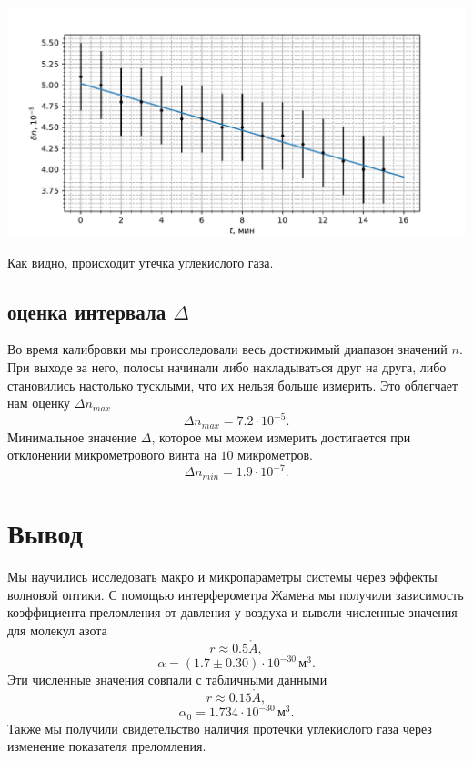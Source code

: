 \documentclass[a4paper,12pt]{article}
\renewcommand{\AA}{\ensuremath{\mathring{A}}}
\begin{document}
\begin{center}
\includegraphics[width=\textwidth]{time.pdf}
\end{center}

Как видно, происходит утечка углекислого газа.

\subsection{оценка интервала $\Delta$}
Во время калибровки мы происследовали весь достижимый диапазон значений $n$. При выходе за него, полосы начинали либо накладываться друг на друга, либо становились настолько тусклыми, что их нельзя больше измерить. Это облегчает нам оценку $\Delta n_{max}$
\[\Delta n_{max} = 7.2 \cdot 10^{-5}.\]
Минимальное значение $\Delta$, которое мы можем измерить достигается при отклонении микрометрового винта на $10$ микрометров.
\[\Delta n_{min} = 1.9 \cdot 10^{-7}.\]

\section*{Вывод}
Мы научились исследовать макро и микропараметры системы через эффекты волновой оптики. С помощью интерферометра Жамена мы получили зависимость коэффициента преломления от давления у воздуха и вывели численные значения для молекул азота
\[r \approx 0.5 \AA,\]
\[\alpha = (1.7\pm0.30) \cdot 10^{-30}\,\text{м}^3.\]
Эти численные значения совпали с табличными данными
\[r \approx 0.15 \AA,\]
\[\alpha_0 = 1.734 \cdot 10^{-30}\,\text{м}^3.\]
Также мы получили свидетельство наличия протечки углекислого газа через изменение показателя преломления.
\end{document}
